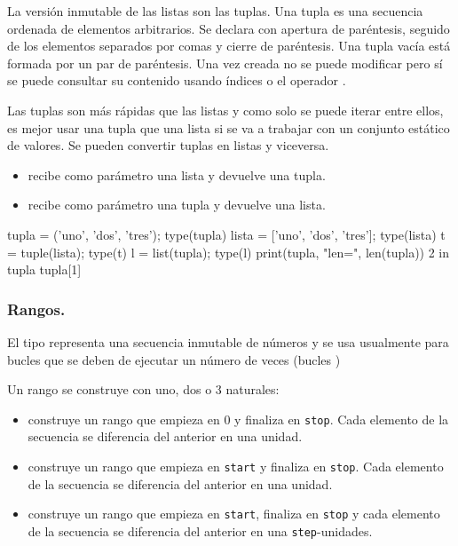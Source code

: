 La versión inmutable de las listas son las tuplas.
Una tupla es una secuencia ordenada de elementos arbitrarios. Se declara con apertura de paréntesis, seguido de los elementos separados por comas y cierre de paréntesis. Una tupla vacía está formada por un par de paréntesis. Una vez creada  no se puede modificar pero sí se puede consultar su contenido usando índices o el operador .


Las tuplas son más rápidas que las listas y como solo se puede iterar entre ellos, es mejor usar una tupla que una lista si se va a trabajar con un conjunto estático de valores. Se pueden convertir tuplas en listas y viceversa.

\begin{itemize}
\item {} recibe como parámetro una lista y devuelve una tupla.
\item {} recibe como parámetro una tupla y devuelve una lista.
\end{itemize}





\begin{example}{}
\begin{pyconsole}[][frame=single]
tupla = ('uno', 'dos', 'tres'); type(tupla)
lista = ['uno', 'dos', 'tres']; type(lista)
t = tuple(lista); type(t)
l = list(tupla); type(l)
print(tupla, "len=", len(tupla))
2 in tupla
tupla[1]
\end{pyconsole}
\end{example}







\subsubsection*{Rangos.  }


El tipo  representa una secuencia inmutable de números y se usa usualmente para bucles que se deben de ejecutar un número de veces (bucles )

Un rango se construye con uno, dos o 3 naturales:

\begin{itemize}
\item {} construye un rango que empieza en 0 y finaliza en {\tt stop}. Cada elemento de la secuencia se diferencia del anterior en una unidad.

\item {} construye un rango que empieza en {\tt start} y finaliza en {\tt stop}. Cada elemento de la secuencia se diferencia del anterior en una unidad.


\item {} construye un rango que empieza en {\tt start}, finaliza en {\tt stop} y cada elemento de la secuencia se diferencia del anterior en una {\tt step}-unidades.
\end{itemize}

